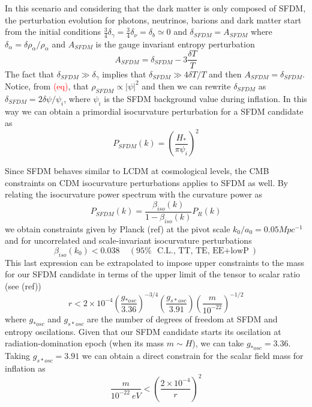 \documentclass[a4paper,fleqn,usenatbib,useAMS]{mnras}
\begin{document}
In this scenario and considering that the dark matter is only composed of SFDM, the perturbation evolution for photons, neutrinos, barions and dark matter start from the initial conditions $\frac{3}{4}\delta_{\gamma}=\frac{3}{4}\delta_\nu=\delta_b\simeq 0$ and $\delta_{SFDM}=A_{SFDM}$ where $\delta_{\alpha}=\delta \rho_\alpha/\rho_\alpha$ and $A_{SFDM}$ is the gauge invariant entropy perturbation
\begin{equation}
A_{SFDM}=\delta_{SFDM}-3\frac{\delta T}{T}
\end{equation}
The fact that $\delta_{SFDM}\gg \delta_{\gamma}$ implies that $\delta_{SFDM}\gg 4\delta T/T$ and then $A_{SFDM}=\delta_{SFDM}$. Notice, from \textcolor{red}{(eq)}, that $\rho_{SFDM}\propto |\psi|^2$ and then we can rewrite $\delta_{SFDM}$ as 
$\delta_{SFDM} = 2\delta \psi/\psi_i
$,
where $\psi_i$ is the SFDM background value during inflation. In this way we can obtain a primordial isocurvature perturbation for a SFDM candidate as
\begin{equation}
P_{SFDM}(k)=\left(\frac{H_*}{\pi \psi_i}\right)^2
\end{equation}

Since SFDM behaves similar to LCDM at cosmological levels, the CMB constraints on CDM isocurvature perturbations applies to SFDM as well. By relating the isocurvature power spectrum with the curvature power as
\begin{equation}
P_{SFDM}(k)=\frac{\beta_{iso}(k)}{1-\beta_{iso}(k)}P_R(k)
\end{equation}
we obtain constraints given by Planck (ref) at the pivot scale $k_0/a_0=0.05Mpc^{-1}$ and for uncorrelated and scale-invariant isocurvature perturbations 
\begin{equation}
\beta_{iso}(k_0)<0.038 \ \ \ \ \ (95\%\ \ \text{C.L., TT, TE, EE$+$lowP})
\end{equation}
This last expression can be extrapolated to impose upper constraints to the mass for our SFDM candidate in terms of the upper limit of the tensor to scalar ratio (see (ref))
\begin{equation}
r<2\times 10^{-4}\left(\frac{g_{*osc}}{3.36}\right)^{-3/4}\left(\frac{g_{s*osc}}{3.91}\right)\left(\frac{m}{10^{-22}}\right)^{-1/2}
\end{equation}
where $g_{*osc}$ and $g_{s*osc}$ are the number of degrees of freedom at SFDM and entropy oscilations. Given that our SFDM candidate starts its oscilation at radiation-domination epoch (when its mass $m\sim H$), we can take $g_{*osc}=3.36$. Taking $g_{s*osc}=3.91$ we can obtain a direct constrain for the scalar field mass for inflation as 
\begin{equation}
\frac{m}{10^{-22}\ eV}<\left(\frac{2\times 10^{-4}}{r}\right)^2
\end{equation}
\end{document}

